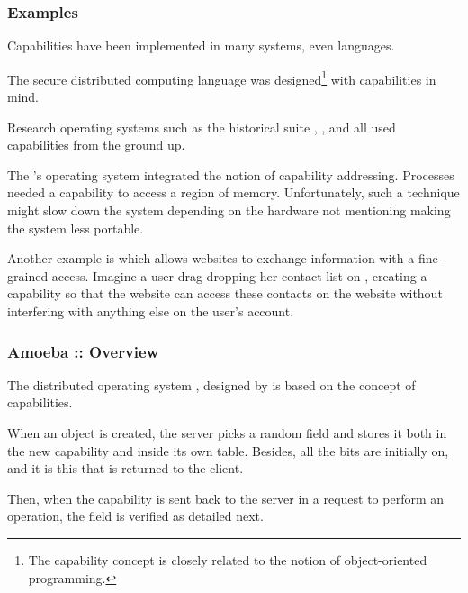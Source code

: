 \begin{frame}
  \frametitle{Examples}

  Capabilities have been implemented in many systems, even languages.

  \-

  The secure distributed computing language  was
  designed\footnote{The capability concept is closely related to the notion
  of object-oriented programming.} with capabilities in mind.

  \-

  Research operating systems such as the historical suite ,
  ,  and  all used capabilities from
  the ground up.

  \-

  The 's operating system  integrated the notion
  of capability addressing. Processes needed a capability to access a region
  of memory. Unfortunately, such a technique might slow down the system
  depending on the hardware not mentioning making the system less portable.

  \-

  Another example is   which allows websites to
  exchange information with a fine-grained access. Imagine a user drag-dropping
  her  contact list on , creating a capability
  so that the  website can access these contacts on the
   website without interfering with anything else on the user's
   account.
\end{frame}


\begin{frame}
  \frametitle{Amoeba :: Overview}

  The distributed operating system , designed by
    is based on the concept of
  capabilities.

  \-

  \begin{center}
  \end{center}

  \-

  When an object is created, the server picks a random  field and
  stores it both in the new capability and inside its own table. Besides,
  all the  bits are initially on, and it is this  that is returned to the client.

  \-
  
  Then, when the capability is sent back to the server in a request to perform
  an operation, the  field is verified as detailed next.
\end{frame}

